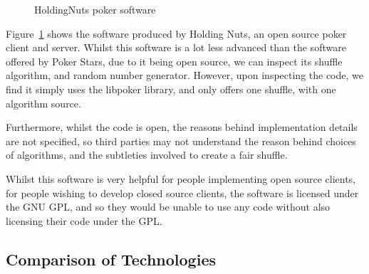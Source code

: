 \begin{figure}[H]
    \caption{HoldingNuts poker software}%
    \label{fig:holdingnuts}
\end{figure}

Figure~\ref{fig:holdingnuts} shows the software produced by Holding Nuts, an
open source poker client and server. Whilst this software is a lot less
advanced than the software offered by Poker Stars, due to it being open source,
we can inspect its shuffle algorithm, and random number generator. However,
upon inspecting the code, we find it simply uses the libpoker \parencite{code:dachary2004}
library, and only offers one shuffle, with one algorithm source.

Furthermore, whilst the code is open, the reasons behind implementation details
are not specified, so third parties may not understand the reason behind choices
of algorithms, and the subtleties involved to create a fair shuffle.

Whilst this software
is very helpful for people implementing open source clients, for people wishing
to develop closed source clients, the software is licensed under the GNU
GPL, and so they would be unable to use any code without also licensing their
code under the GPL\@.

\subsection{Comparison of Technologies}

